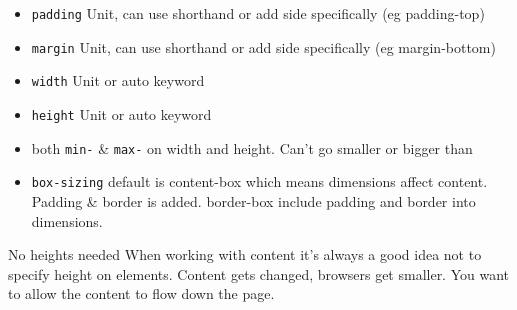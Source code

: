 \begin{itemize}
    \item \texttt{padding} Unit, can use shorthand or add side specifically (eg padding-top)
    \item \texttt{margin} Unit, can use shorthand or add side specifically (eg margin-bottom)
    \item \texttt{width} Unit or auto keyword
    \item \texttt{height} Unit or auto keyword
    \item both \texttt{min-} \& \texttt{max-} on width and height. Can't go smaller or bigger than
    \item \texttt{box-sizing} default is content-box which means dimensions affect content. Padding \& border is added. border-box include padding and border into dimensions.
\end{itemize}

\begin{infobox}{No heights needed}
    When working with content it's always a good idea not to specify height on elements. Content gets changed, browsers get smaller. You want to allow the content to flow down the page.
\end{infobox}

